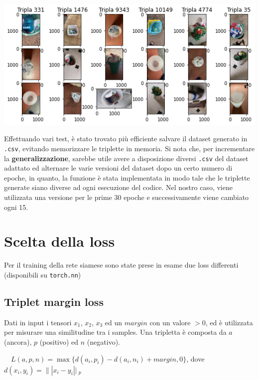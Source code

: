 \documentclass[11pt]{article}
\begin{document}
\begin{center}
    \begin{minipage}{0.6\linewidth}
    \includegraphics[width=\linewidth]{triplet_dataset.png}
    \end{minipage}
\end{center}

Effettuando vari test, è stato trovato più efficiente salvare il dataset generato in
\texttt{.csv}, evitando memorizzare le triplette in memoria. Si nota che, per incrementare
la \textbf{generalizzazione}, sarebbe utile avere a disposizione diversi
\texttt{.csv} del dataset adattato ed alternare le varie versioni del dataset dopo un certo numero di epoche, 
in quanto, la funzione è stata implementata in modo tale che le triplette generate siano diverse ad ogni esecuzione del codice. Nel nostro caso, viene utilizzata
una versione per le prime 30 epoche e successivamente viene cambiato ogni 15.

\pagebreak
\section{Scelta della loss}

Per il training della rete siamese sono state prese in esame due loss differenti (disponibili su \texttt{torch.nn})

\subsection{Triplet margin loss}
Dati in input i tensori $x_1$, $x_2$, $x_3$ ed un $margin$ con un valore $> 0$, ed è
utilizzata per misurare una similitudine tra i samples.
Una tripletta è composta da $a$ (ancora), $p$ (positivo) ed $n$ (negativo). 
\begin{center}
    \ \
    $L(a,p,n) = \max{ \{ d(a_i, p_i) - d(a_i, n_i) + margin, 0 \} }$, dove \ \
    \\
    $d(x_i, y_i) = \|| x_i - y_i ||\ _p$
    \ \
\end{center}
\end{document}
